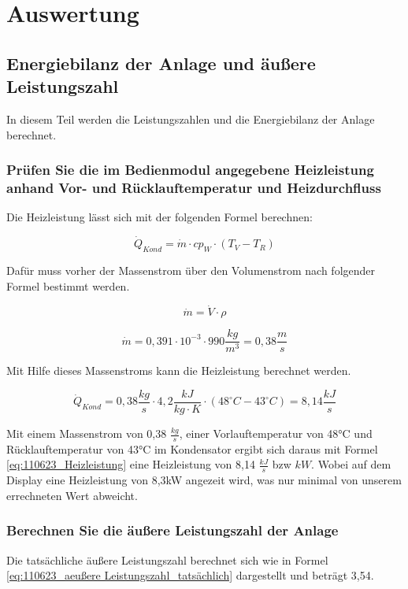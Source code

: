 \section{Auswertung}
\label{sec:Auswertung}
\subsection{Energiebilanz der Anlage und äußere Leistungszahl}
In diesem Teil werden die Leistungszahlen und die Energiebilanz der Anlage berechnet.

\subsubsection{Prüfen Sie die im Bedienmodul angegebene Heizleistung anhand Vor- und Rücklauftemperatur und Heizdurchfluss}
\label{subsubsec:Heizleistung}

Die Heizleistung lässt sich mit der folgenden Formel berechnen:

\begin{equation}
\dot Q_{Kond}= \dot m \cdot cp_{W} \cdot (T_{V} - T_{R})
\label{eq:110623_Heizleistung}
\end{equation}

Dafür muss vorher der Massenstrom über den Volumenstrom nach folgender Formel bestimmt werden.

\begin{equation}
    \dot{m}= \dot{V}\cdot \rho
\end{equation}

$$\dot{m}= 0,391 \cdot 10^{-3} \cdot 990 \frac{kg}{m^3}=0,38 \frac{m}{s}$$

Mit Hilfe dieses Massenstroms kann die Heizleistung berechnet werden.

$$\dot Q_{Kond}= 0,38 \frac{kg}{s} \cdot 4,2 \frac{kJ}{kg \cdot K} \cdot (48 ^{\circ}C - 43 ^{\circ}C) = 8,14 \frac{kJ}{s}$$

Mit einem Massenstrom von 0,38 $\frac{kg}{s}$, einer Vorlauftemperatur von 48°C und Rücklauftemperatur von 43°C im Kondensator ergibt sich daraus mit Formel \ref{eq:110623_Heizleistung} eine Heizleistung von 8,14 $\frac{kJ}{s}$ bzw $kW$. Wobei auf dem Display eine Heizleistung von 8,3kW angezeit wird, was nur minimal von unserem errechneten Wert abweicht.
\subsubsection{Berechnen Sie die äußere Leistungszahl der Anlage}
Die tatsächliche äußere Leistungszahl berechnet sich wie in Formel \ref{eq:110623_aeußere Leistungszahl_tatsächlich} dargestellt und beträgt 3,54.

